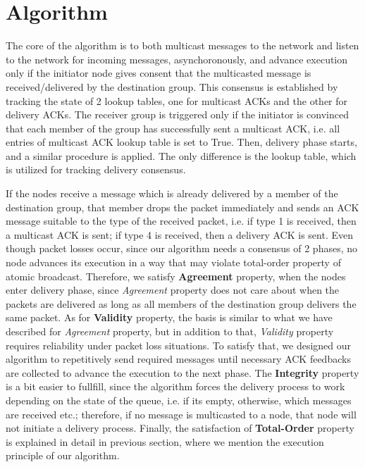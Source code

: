\documentclass[a4paper, 12pt]{article}
\begin{document}
\section{Algorithm}
The core of the algorithm is to both multicast messages to the network and listen to the network for incoming messages, asynchoronously, and advance execution only if the initiator node gives consent that the multicasted message is received/delivered by the destination group. This consensus is established by tracking the state of 2 lookup tables, one for multicast ACKs and the other for delivery ACKs. The receiver group is triggered only if the initiator is convinced that each member of the group has successfully sent a multicast ACK, i.e. all entries of multicast ACK lookup table is set to True. Then, delivery phase starts, and a similar procedure is applied. The only difference is the lookup table, which is utilized for tracking delivery consensus.

If the nodes receive a message which is already delivered by a member of the destination group, that member drops the packet immediately and sends an ACK message suitable to the type of the received packet, i.e. if type 1 is received, then a multicast ACK is sent; if type 4 is received, then a delivery ACK is sent. Even though packet losses occur, since our algorithm needs a consensus of 2 phases, no node advances its execution in a way that may violate total-order property of atomic broadcast. Therefore, we satisfy \textbf{Agreement} property, when the nodes enter delivery phase, since \textit{Agreement} property does not care about when the packets are delivered as long as all members of the destination group delivers the same packet. As for \textbf{Validity} property, the basis is similar to what we have described for \textit{Agreement} property, but in addition to that, \textit{Validity} property requires reliability under packet loss situations. To satisfy that, we designed our algorithm to repetitively send required messages until necessary ACK feedbacks are collected to advance the execution to the next phase. The \textbf{Integrity} property is a bit easier to fullfill, since the algorithm forces the delivery process to work depending on the state of the queue, i.e. if its empty, otherwise, which messages are received etc.; therefore, if no message is multicasted to a node, that node will not initiate a delivery process. Finally, the satisfaction of \textbf{Total-Order} property is explained in detail in previous section, where we mention the execution principle of our algorithm.
\end{document}
